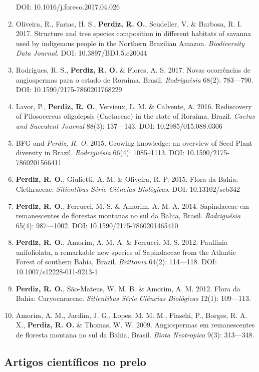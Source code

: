 \documentclass[11pt, a4paper]{awesome-cv}
\begin{document}
\begin{enumerate}
  DOI: 10.1016/j.foreco.2017.04.026
\item
  Oliveira, R., Farias, H. S., \textbf{Perdiz, R. O.}, Scudeller, V. \& Barbosa, R. I. 2017. Structure and tree species composition in different habitats of savanna used by indigenous people in the Northern Brazilian Amazon. \emph{Biodiversity Data Journal}.
  DOI: 10.3897/BDJ.5.e20044
\item
  Rodrigues, R. S., \textbf{Perdiz, R. O.} \& Flores, A. S. 2017. Novas ocorrências de angiospermas para o estado de Roraima, Brasil. \emph{Rodriguésia} 68(2): 783---790.
  DOI: 10.1590/2175-7860201768229
\item
  Lavor, P., \textbf{Perdiz, R. O.}, Versieux, L. M. \& Calvente, A. 2016. Rediscovery of Pilosocereus oligolepsis (Cactaceae) in the state of Roraima, Brazil. \emph{Cactus and Succulent Journal} 88(3): 137---143.
  DOI: 10.2985/015.088.0306
\item
  BFG and \emph{Perdiz, R. O.} 2015. Growing knowledge: an overview of Seed Plant diversity in Brazil. \emph{Rodriguésia} 66(4): 1085--1113.
  DOI: 10.1590/2175-7860201566411
\item
  \textbf{Perdiz, R. O.}, Giulietti, A. M. \& Oliveira, R. P. 2015. Flora da Bahia: Clethraceae. \emph{Sitientibus Série Ciências Biológicas}.
  DOI: 10.13102/scb342
\item
  \textbf{Perdiz, R. O.}, Ferrucci, M. S. \& Amorim, A. M. A. 2014. Sapindaceae em remanescentes de florestas montanas no sul da Bahia, Brasil. \emph{Rodriguésia} 65(4): 987---1002.
  DOI: 10.1590/2175-7860201465410
\item
  \textbf{Perdiz, R. O.}, Amorim, A. M. A. \& Ferrucci, M. S. 2012. Paullinia unifoliolata, a remarkable new species of Sapindaceae from the Atlantic Forest of southern Bahia, Brazil. \emph{Brittonia} 64(2): 114---118.
  DOI: 10.1007/s12228-011-9213-1
\item
  \textbf{Perdiz, R. O.}, São-Mateus, W. M. B. \& Amorim, A. M. 2012. Flora da Bahia: Caryocaraceae. \emph{Sitientibus Série Ciências Biológicas} 12(1): 109---113.
\item
  Amorim, A. M., Jardim, J. G., Lopes, M. M. M., Fiaschi, P., Borges, R. A. X., \textbf{Perdiz, R. O.} \& Thomas, W. W. 2009. Angiospermas em remanescentes de floresta montana no sul da Bahia, Brasil. \emph{Biota Neotropica} 9(3): 313---348.
\end{enumerate}

\hypertarget{artigos-cientuxedficos-no-prelo}{%
\subsection{Artigos científicos no prelo}\label{artigos-cientuxedficos-no-prelo}}
\end{document}
